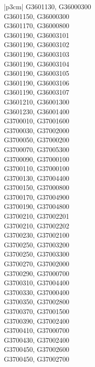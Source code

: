 \begin{customLongTable}{ |p{3cm}| }
G3601130, G36000300 \\ \hline
G3601150, G36000300 \\ \hline
G3601170, G36000800 \\ \hline
G3601190, G36003101 \\ \hline
G3601190, G36003102 \\ \hline
G3601190, G36003103 \\ \hline
G3601190, G36003104 \\ \hline
G3601190, G36003105 \\ \hline
G3601190, G36003106 \\ \hline
G3601190, G36003107 \\ \hline
G3601210, G36001300 \\ \hline
G3601230, G36001400 \\ \hline
G3700010, G37001600 \\ \hline
G3700030, G37002000 \\ \hline
G3700050, G37000200 \\ \hline
G3700070, G37005300 \\ \hline
G3700090, G37000100 \\ \hline
G3700110, G37000100 \\ \hline
G3700130, G37004400 \\ \hline
G3700150, G37000800 \\ \hline
G3700170, G37004900 \\ \hline
G3700190, G37004800 \\ \hline
G3700210, G37002201 \\ \hline
G3700210, G37002202 \\ \hline
G3700230, G37002100 \\ \hline
G3700250, G37003200 \\ \hline
G3700250, G37003300 \\ \hline
G3700270, G37002000 \\ \hline
G3700290, G37000700 \\ \hline
G3700310, G37004400 \\ \hline
G3700330, G37000400 \\ \hline
G3700350, G37002800 \\ \hline
G3700370, G37001500 \\ \hline
G3700390, G37002400 \\ \hline
G3700410, G37000700 \\ \hline
G3700430, G37002400 \\ \hline
G3700450, G37002600 \\ \hline
G3700450, G37002700 \\ \hline

\end{customLongTable}
